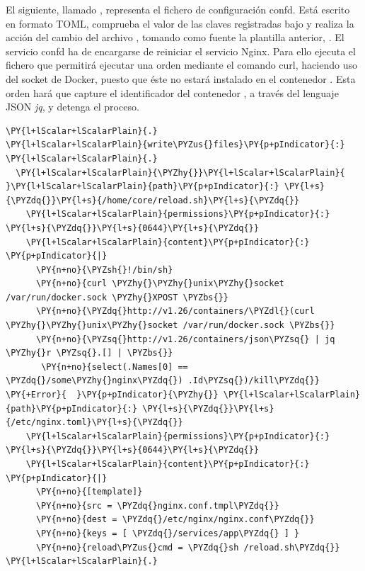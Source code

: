 El siguiente, llamado , representa el fichero de configuración confd. Está escrito en formato TOML, comprueba el valor de las claves registradas bajo  y realiza la acción del cambio del archivo , tomando como fuente la plantilla anterior, . El servicio confd ha de encargarse de reiniciar el servicio Nginx. Para ello ejecuta el fichero  que permitirá ejecutar una orden mediante el comando curl, haciendo uso del socket de Docker, puesto que éste no estará instalado en el contenedor . Esta orden hará que capture el identificador del contenedor , a través del lenguaje JSON \textit{jq}, y detenga el proceso. 

\begin{codelisting}
\label{code:nginx.conf.tmpl}
\begin{Verbatim}[fontsize=\relsize{-2.5},fontseries=b,commandchars=\\\{\}]
\PY{l+lScalar+lScalarPlain}{.}
\PY{l+lScalar+lScalarPlain}{write\PYZus{}files}\PY{p+pIndicator}{:}
\PY{l+lScalar+lScalarPlain}{.}
  \PY{l+lScalar+lScalarPlain}{\PYZhy{}}\PY{l+lScalar+lScalarPlain}{ }\PY{l+lScalar+lScalarPlain}{path}\PY{p+pIndicator}{:} \PY{l+s}{\PYZdq{}}\PY{l+s}{/home/core/reload.sh}\PY{l+s}{\PYZdq{}}
    \PY{l+lScalar+lScalarPlain}{permissions}\PY{p+pIndicator}{:} \PY{l+s}{\PYZdq{}}\PY{l+s}{0644}\PY{l+s}{\PYZdq{}}
    \PY{l+lScalar+lScalarPlain}{content}\PY{p+pIndicator}{:} \PY{p+pIndicator}{|}
      \PY{n+no}{\PYZsh{}!/bin/sh}
      \PY{n+no}{curl \PYZhy{}\PYZhy{}unix\PYZhy{}socket /var/run/docker.sock \PYZhy{}XPOST \PYZbs{}}
      \PY{n+no}{\PYZdq{}http://v1.26/containers/\PYZdl{}(curl \PYZhy{}\PYZhy{}unix\PYZhy{}socket /var/run/docker.sock \PYZbs{}}
      \PY{n+no}{\PYZsq{}http://v1.26/containers/json\PYZsq{} | jq \PYZhy{}r \PYZsq{}.[] | \PYZbs{}}
       \PY{n+no}{select(.Names[0] == \PYZdq{}/some\PYZhy{}nginx\PYZdq{}) .Id\PYZsq{})/kill\PYZdq{}}
\PY{+Error}{  }\PY{p+pIndicator}{\PYZhy{}} \PY{l+lScalar+lScalarPlain}{path}\PY{p+pIndicator}{:} \PY{l+s}{\PYZdq{}}\PY{l+s}{/etc/nginx.toml}\PY{l+s}{\PYZdq{}}
    \PY{l+lScalar+lScalarPlain}{permissions}\PY{p+pIndicator}{:} \PY{l+s}{\PYZdq{}}\PY{l+s}{0644}\PY{l+s}{\PYZdq{}}
    \PY{l+lScalar+lScalarPlain}{content}\PY{p+pIndicator}{:} \PY{p+pIndicator}{|}
      \PY{n+no}{[template]}
      \PY{n+no}{src = \PYZdq{}nginx.conf.tmpl\PYZdq{}}
      \PY{n+no}{dest = \PYZdq{}/etc/nginx/nginx.conf\PYZdq{}}
      \PY{n+no}{keys = [ \PYZdq{}/services/app\PYZdq{} ] }
      \PY{n+no}{reload\PYZus{}cmd = \PYZdq{}sh /reload.sh\PYZdq{}}
\PY{l+lScalar+lScalarPlain}{.}
\end{Verbatim}
\end{codelisting}

